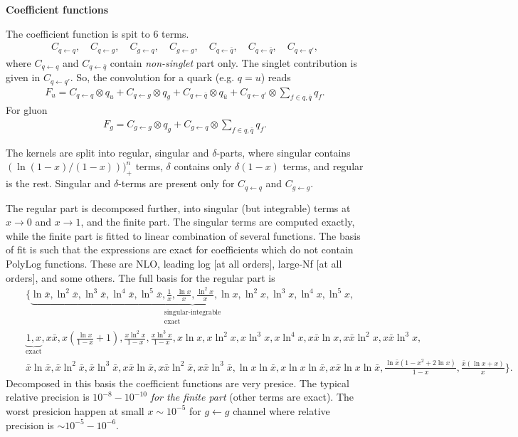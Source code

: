 \documentclass[prd,nofootinbib,eqsecnum,final]{revtex4}
\newcommand{\nn}{\nonumber}
\newcommand{\ot}{\leftarrow}
\renewcommand{\(}{\left(}
\renewcommand{\)}{\right)}
\renewcommand{\[}{\left[}
\renewcommand{\]}{\right]}
\begin{document}
\begin{center}
\textbf{Coefficient functions}
\end{center}

The coefficient function is spit to 6 terms.
\begin{eqnarray}
C_{q\ot q},\quad C_{q\ot g},\quad C_{g\ot q},\quad C_{g\ot g},\quad C_{q\ot \bar q},\quad C_{q\ot \bar q},\quad C_{q\ot q'},
\end{eqnarray}
where $C_{q\ot q}$ and $C_{q\ot \bar q}$ contain \textit{non-singlet} part only. The singlet contribution is given in $C_{q\ot q'}$. So, the convolution for a quark (e.g. $q=u$) reads
\begin{eqnarray}
F_u=C_{q\ot q}\otimes q_u+C_{q\ot g}\otimes q_g+C_{q\ot \bar q}\otimes q_{\bar u}+C_{q\ot q'}\otimes \sum_{f\in q,\bar q} q_f.
\end{eqnarray}
For gluon
\begin{eqnarray}
F_g=C_{g\ot g}\otimes q_g+C_{g\ot q}\otimes \sum_{f\in q,\bar q} q_f.
\end{eqnarray}

The kernels are split into regular, singular and $\delta$-parts, where singular contains $(\ln(1-x)/(1-x)))_+^n$ terms, $\delta$ contains only $\delta(1-x)$ terms, and regular is the rest. Singular and $\delta$-terms are present only for $C_{q\ot q}$ and $C_{g\ot g}$.

The regular part is decomposed further, into singular (but integrable) terms at $x\to0 $ and $x\to 1$, and the finite part. The singular terms are computed exactly, while the finite part is fitted to linear combination of several functions. The basis of fit is such that the expressions are exact for coefficients which do not contain PolyLog functions. These are NLO, leading log [at all orders], large-Nf [at all orders], and some others. The full basis for the regular part is
\begin{eqnarray}
&&\Big\{\underbrace{\ln \bar x,\ln^2\bar x,\ln^3\bar x,\ln^4\bar x,\ln^5\bar x,
\frac{1}{x},\frac{\ln x}{x},\frac{\ln^2x}{x},
\ln x,\ln^2x,\ln^3x,\ln^4x,\ln^5x,}_{\substack{\text{singular-integrable} \\ \text{exact}}}
\\\nn&&
\underbrace{1,x}_{\text{exact}},x\bar x ,
x\(\frac{\ln x}{1-x}+1\), \frac{x \ln^2x}{1-x}, \frac{x\ln^3x}{1-x},
x\ln x,x\ln^2x,x\ln^3x,x\ln^4x,
x\bar x\ln x,x\bar x\ln^2x,x\bar x\ln^3x,
\\\nn &&
\bar x\ln\bar x,\bar x\ln^2\bar x,\bar x\ln^3\bar x,
x\bar x\ln\bar x,x\bar x\ln^2\bar x,x\bar x\ln^3\bar x,
\ln x\ln\bar x,x\ln x\ln\bar x,x\bar x\ln x\ln\bar x,
\frac{\ln\bar x(1-x^2+2\ln x)}{1-x},
\frac{\bar x(\ln x+x)}{x}
\Big\}.
\end{eqnarray}
Decomposed in this basis the coefficient functions are very presice. The typical relative precision is $10^{-8}-10^{-10}$ \textit{for the finite part} (other terms are exact). The worst presicion happen at small $x\sim 10^{-5}$ for $g\ot g$ channel where relative precision is $\sim 10^{-5}-10^{-6}$.
\end{document}
